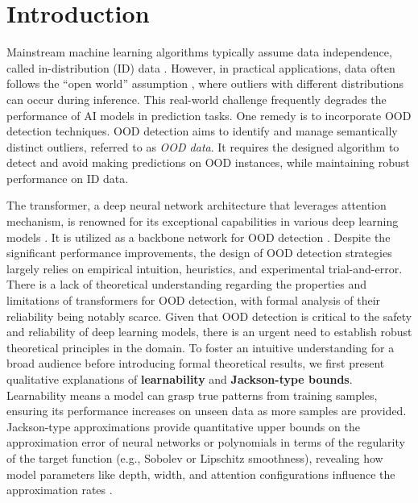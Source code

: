 \documentclass{article}
\theoremstyle{plain}
\theoremstyle{definition}
\theoremstyle{remark}
\begin{document}
\section{Introduction}
Mainstream machine learning algorithms typically assume data independence, called in-distribution (ID) data \citep{krizhevsky2012imagenet, he2015delving}. However, in practical applications, data often follows the ``open world'' assumption \citep{drummond2006open}, where outliers with different distributions can occur during inference. This real-world challenge frequently degrades the performance of AI models in prediction tasks. One remedy is to incorporate OOD detection techniques. 
%
OOD detection aims to identify and manage semantically distinct outliers, referred to as \emph{OOD data}. It requires the designed algorithm to detect and avoid making predictions on OOD instances, while maintaining robust performance on ID data.

The transformer, a deep neural network architecture that leverages attention mechanism, is renowned for its exceptional capabilities in various deep learning models \citep{vaswani2017attention}. It is utilized as a backbone network for OOD detection \citep{koner2021oodformer, graham2022transformer, hendrycks2020pretrained}.
%
Despite the significant performance improvements, the design of OOD detection strategies largely relies on empirical intuition, heuristics, and experimental trial-and-error.
%
There is a lack of theoretical understanding regarding the properties and limitations of transformers for OOD detection, with formal analysis of their reliability being notably scarce. 
%
Given that OOD detection is critical to the safety and reliability of deep learning models, there is an urgent need to establish robust theoretical principles in the domain.
%
To foster an intuitive understanding for a broad audience before introducing formal theoretical results, we first present qualitative explanations of \textbf{learnability} and \textbf{Jackson-type bounds}. 
Learnability means a model can grasp true patterns from training samples, ensuring its performance increases on unseen data as more samples are provided.
Jackson-type approximations provide quantitative upper bounds on the approximation error of neural networks or polynomials in terms of the regularity of the target function (e.g., Sobolev or Lipschitz smoothness), revealing how model parameters like depth, width, and attention configurations influence the approximation rates \citep{jackson1930theory, jiang2024approximation}.
\end{document}
